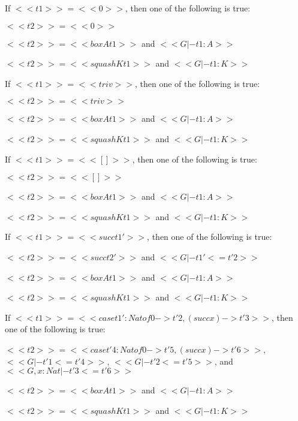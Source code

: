 \begin{lemma}
\begin{enumR}
  \item If $<<t1>> = <<0>>$, then one of the following is true:
    \begin{enumA}
    \item $<<t2>> = <<0>>$
    \item $<<t2>> = <<box A t1>>$ and $<<G |- t1 : A>>$
    \item $<<t2>> = <<squash K t1>>$ and $<<G |- t1 : K>>$
    \end{enumA}

  \item If $<<t1>> = <<triv>>$, then one of the following is true:
    \begin{enumA}
    \item $<<t2>> = <<triv>>$
    \item $<<t2>> = <<box A t1>>$ and $<<G |- t1 : A>>$
    \item $<<t2>> = <<squash K t1>>$ and $<<G |- t1 : K>>$
    \end{enumA}

  \item If $<<t1>> = << [] >>$, then one of the following is true:
    \begin{enumA}
    \item $<<t2>> = << [] >>$
    \item $<<t2>> = <<box A t1>>$ and $<<G |- t1 : A>>$
    \item $<<t2>> = <<squash K t1>>$ and $<<G |- t1 : K>>$
    \end{enumA}

  \item If $<<t1>> = <<succ t1'>>$, then one of the following is true:
    \begin{enumA}
    \item $<<t2>> = <<succ t2'>>$ and $<<G |- t1' <= t'2>>$
    \item $<<t2>> = <<box A t1>>$ and $<<G |- t1 : A>>$
    \item $<<t2>> = <<squash K t1>>$ and $<<G |- t1 : K>>$
    \end{enumA}

  \item If $<<t1>> = <<case t1' : Nat of 0 -> t'2, (succ x) -> t'3>>$,
    then one of the following is true:
    \begin{enumA}
    \item $<<t2>> = <<case t'4 : Nat of 0 -> t'5, (succ x) -> t'6>>$,
      $<<G |- t'1 <= t'4>>$, $<<G |- t'2 <= t'5>>$, and $<<G, x : Nat |- t'3 <= t'6>>$
    \item $<<t2>> = <<box A t1>>$ and $<<G |- t1 : A>>$
    \item $<<t2>> = <<squash K t1>>$ and $<<G |- t1 : K>>$
    \end{enumA}


\end{enumR}
\end{lemma}
